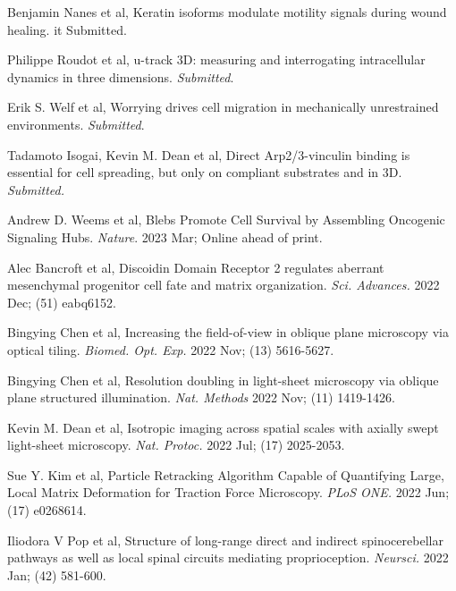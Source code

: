 
\begin{etaremune}

\item Benjamin Nanes et al, Keratin isoforms modulate motility signals during wound healing. {it Submitted}.

\item Philippe Roudot et al, u-track 3D: measuring and interrogating intracellular dynamics in three dimensions.  {\it Submitted}.

\item Erik S. Welf et al, Worrying drives cell migration in mechanically unrestrained environments. {\it Submitted}.

\item Tadamoto Isogai, Kevin M. Dean et al, Direct Arp2/3-vinculin binding is essential for cell spreading, but only on compliant substrates and in 3D. {\it Submitted.}  

\item Andrew D. Weems et al, Blebs Promote Cell Survival by Assembling Oncogenic Signaling Hubs. {\it Nature}. 2023 Mar; Online ahead of print.

\item Alec Bancroft et al, Discoidin Domain Receptor 2 regulates aberrant mesenchymal progenitor cell fate and matrix organization. {\it Sci. Advances.} 2022 Dec; (51) eabq6152.

\item Bingying Chen et al, Increasing the field-of-view in oblique plane microscopy via optical tiling. {\it Biomed. Opt. Exp.} 2022 Nov; (13) 5616-5627.

\item Bingying Chen et al, Resolution doubling in light-sheet microscopy via oblique plane structured illumination. {\it Nat. Methods} 2022 Nov; (11) 1419-1426.

\item Kevin M. Dean et al, Isotropic imaging across spatial scales with axially swept light-sheet microscopy. {\it Nat. Protoc.} 2022 Jul; (17) 2025-2053.

\item Sue Y. Kim et al, Particle Retracking Algorithm Capable of Quantifying Large, Local Matrix Deformation for Traction Force Microscopy. {\it PLoS ONE.} 2022 Jun; (17) e0268614. 

\item Iliodora V Pop et al, Structure of long-range direct and indirect spinocerebellar pathways as well as local spinal circuits mediating proprioception. {\it Neursci.} 2022 Jan; (42) 581-600.


\end{etaremune}
